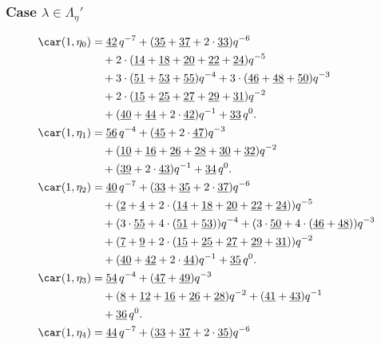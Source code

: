 \subsubsection{Case $\lambda\in \Lambda_\eta'$}

\begin{align*}
	\car(1,\eta_{0})
	&=\underline{42}\,q^{-7}+(\underline{35}+\underline{37}+2\cdot\underline{33})q^{-6}\\
	&\quad+2\cdot(\underline{14}+\underline{18}+\underline{20}+\underline{22}+\underline{24})q^{-5}\\
	&\quad+3\cdot(\underline{51}+\underline{53}+\underline{55})q^{-4}+3\cdot(\underline{46}+\underline{48}+\underline{50})q^{-3}\\
	&\quad+2\cdot(\underline{15}+\underline{25}+\underline{27}+\underline{29}+\underline{31})q^{-2}\\
	&\quad+(\underline{40}+\underline{44}+2\cdot\underline{42})q^{-1}+\underline{33}\,q^0.\\
	\car(1,\eta_{1})
	&=\underline{56}\,q^{-4}+(\underline{45}+2\cdot\underline{47})q^{-3}\\
	&\quad+(\underline{10}+\underline{16}+\underline{26}+\underline{28}+\underline{30}+\underline{32})q^{-2}\\
	&\quad+(\underline{39}+2\cdot\underline{43})q^{-1}+\underline{34}\,q^0.\\
	\car(1,\eta_{2})
	&=\underline{40}\,q^{-7}+(\underline{33}+\underline{35}+2\cdot\underline{37})q^{-6}\\
	&\quad+(\underline{2}+\underline{4}+2\cdot(\underline{14}+\underline{18}+\underline{20}+\underline{22}+\underline{24}))q^{-5}\\
	&\quad+(3\cdot\underline{55}+4\cdot(\underline{51}+\underline{53}))q^{-4}+(3\cdot\underline{50}+4\cdot(\underline{46}+\underline{48}))q^{-3}\\
	&\quad+(\underline{7}+\underline{9}+2\cdot(\underline{15}+\underline{25}+\underline{27}+\underline{29}+\underline{31}))q^{-2}\\
	&\quad+(\underline{40}+\underline{42}+2\cdot\underline{44})q^{-1}+\underline{35}\,q^0.\\
	\car(1,\eta_{3})
	&=\underline{54}\,q^{-4}+(\underline{47}+\underline{49})q^{-3}\\
	&\quad+(\underline{8}+\underline{12}+\underline{16}+\underline{26}+\underline{28})q^{-2}+(\underline{41}+\underline{43})q^{-1}\\
	&\quad+\underline{36}\,q^0.\\
	\car(1,\eta_{4})
	&=\underline{44}\,q^{-7}+(\underline{33}+\underline{37}+2\cdot\underline{35})q^{-6}\\

\end{align*}
